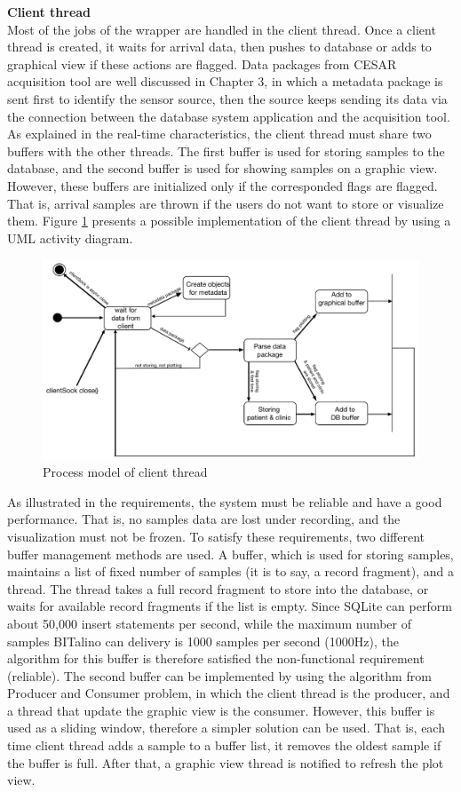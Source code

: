 \textbf{Client thread}\\
Most of the jobs of the wrapper are handled in the client thread. Once a client thread is created, it waits for arrival data, then pushes to database or adds to graphical view if these actions are flagged. Data packages from CESAR acquisition tool are well discussed in Chapter 3, in which a metadata package is sent first to identify the sensor source, then the source keeps sending its data via the connection between the database system application and the acquisition tool. As explained in the real-time characteristics, the client thread must share two buffers with the other threads. The first buffer is used for storing samples to the database, and the second buffer is used for showing samples on a graphic view. However, these buffers are initialized only if the corresponded flags are flagged. That is, arrival samples are thrown if the users do not want to store or visualize them. Figure \ref{fig:Figures/ClientThreadAc} presents a possible implementation of the client thread by using a UML activity diagram.
\begin{figure}[ht]
    \centering
    \includegraphics[width=1.0\textwidth]{Figures/ClientThreadAc.png}
    \caption{Process model of client thread}
    \label{fig:Figures/ClientThreadAc}
\end{figure}
As illustrated in the requirements, the system must be reliable and have a good performance. That is, no samples data are lost under recording, and the visualization must not be frozen. To satisfy these requirements, two different buffer management methods are used. A buffer, which is used for storing samples, maintains a list of fixed number of samples (it is to say, a record fragment), and a thread. The thread takes a full record fragment to store into the database, or waits for available record fragments if the list is empty. Since SQLite can perform about 50,000\cite{SQLITEORG_INSERT} insert statements per second, while the maximum number of samples BITalino can delivery is 1000 samples per second (1000Hz), the algorithm for this buffer is therefore satisfied the non-functional requirement (reliable). The second buffer can be implemented by using the algorithm from Producer and Consumer problem, in which the client thread is the producer, and a thread that update the graphic view is the consumer. However, this buffer is used as a sliding window, therefore a simpler solution can be used. That is, each time client thread adds a sample to a buffer list, it removes the oldest sample if the buffer is full. After that, a graphic view thread is notified to refresh the plot view.\\
